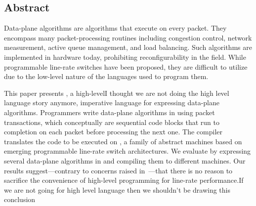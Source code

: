 \subsection*{Abstract}
Data-plane algorithms are algorithms that execute on every packet. They
encompass many packet-processing routines including congestion control, network
measurement, active queue management, and load balancing. Such algorithms are
implemented in hardware today, prohibiting reconfigurability in the field.
While programmable line-rate switches have been proposed, they are difficult to
utilize due to the low-level nature of the languages used to program them.

This paper presents \pktlanguage, a high-level\ac{I thought we are not doing the 
high level language story anymore}, imperative language for
expressing data-plane algorithms. Programmers write data-plane algorithms in
\pktlanguage using packet transactions, which conceptually are 
sequential code blocks that run to
completion on each packet before processing the next one. The \pktlanguage compiler translates
the code to be executed on \absmachine, a family of abstract machines
based on emerging programmable line-rate switch architectures. We evaluate
\pktlanguage by expressing several data-plane algorithms in \pktlanguage and
compiling them to different \absmachine machines. Our results suggest---contrary
to concerns raised in~\cite{p4}---that there is no reason to sacrifice the
convenience of high-level programming for line-rate performance.\ac{If we are not
going for high level language then we shouldn't be drawing this conclusion}
